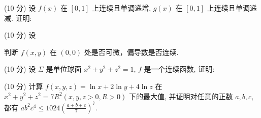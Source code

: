 \par{}
(10 分) 设 $f(x)$ 在 $[0,1]$ 上连续且单调递增, $g(x)$ 在 $[0,1]$ 上连续且单调递减. 证明:\par
\nopagebreak[4]
\par{}
(10 分) 设\par
\nopagebreak[4]
判断  $f(x,y)$  在  $(0,0)$  处是否可微，偏导数是否连续.\par
\par{}
(10 分) 设 $\Sigma$ 是单位球面 $x^{2} + y^{2} + z^{2} = 1$, $f$ 是一个连续函数, 证明:\par
\nopagebreak[4]
(10 分) 计算 $f(x, y, z) = \ln x + 2\ln y + 4\ln z$ 在 $x^2 + y^2 + z^2 = 7R^2 (x, y, z > 0, R > 0)$ 下的最大值, 并证明对任意的正数 $a, b, c$, 都有 $ab^2c^4 \leq 1024\left(\frac{a + b + c}{7}\right)^7$.\par
